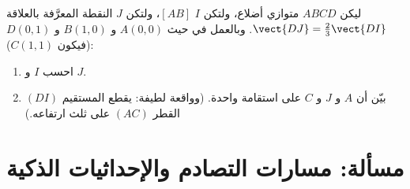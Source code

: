 \begin{exercise}[$\star\star\star$]\label{exo:g11:vect:11}
ليكن $ABCD$ متوازي أضلاع، ولتكن $I$  $[AB]$، ولتكن $J$
النقطة المعرَّفة بالعلاقة $\vect{DJ} = \frac23 \vect{DI}$. وبالعمل في
 حيث $A(0,0)$ و $B(1,0)$ و $D(0,1)$ (فيكون $C(1,1)$):
\begin{enumerate}
  \item احسب  $I$ و $J$.
  \item بيّن أن $A$ و $J$ و $C$ على استقامة واحدة. (وواقعة لطيفة: يقطع المستقيم
        $(DI)$ القطر $(AC)$ على ثلث ارتفاعه.)
\end{enumerate}
\end{exercise}

\section{مسألة: مسارات التصادم والإحداثيات الذكية}

